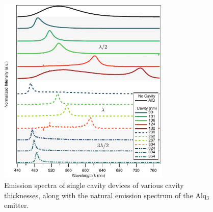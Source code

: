\documentclass{report}
\begin{document}
    
        \begin{figure}[h!]%
            \centering
            \includegraphics[width=0.73\textwidth]{images/n1_spectra.png}
            \caption{Emission spectra of single cavity devices of various cavity thicknesses, along with the natural emission spectrum of the Alq$_3$ emitter.}
            \label{fig:n1_spectra}
        \end{figure}
        
\end{document}
